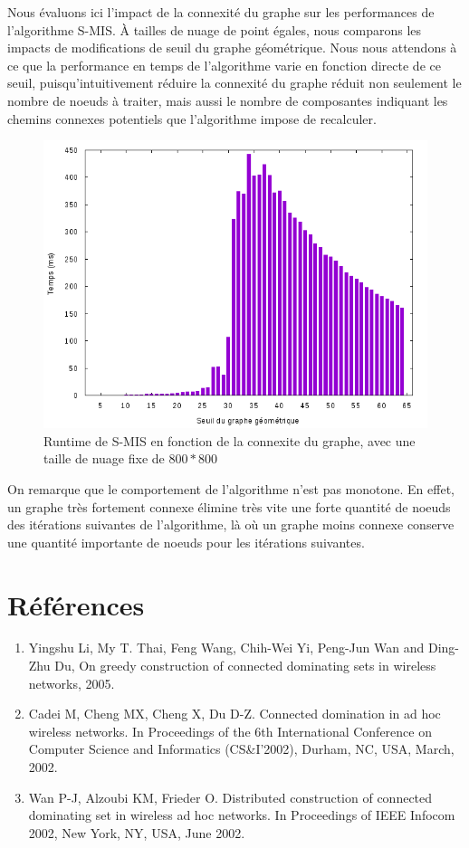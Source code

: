 \documentclass[]{report}
\providecommand{\tightlist}{%
  \setlength{\itemsep}{0pt}\setlength{\parskip}{0pt}}
\begin{document}
Nous évaluons ici l'impact de la connexité du graphe sur les
performances de l'algorithme S-MIS. À tailles de nuage de point égales,
nous comparons les impacts de modifications de seuil du graphe
géométrique. Nous nous attendons à ce que la performance en temps de
l'algorithme varie en fonction directe de ce seuil, puisqu'intuitivement
réduire la connexité du graphe réduit non seulement le nombre de noeuds
à traiter, mais aussi le nombre de composantes indiquant les chemins
connexes potentiels que l'algorithme impose de recalculer.

\begin{figure}
\centering
\includegraphics{img/connex.png}
\caption{Runtime de S-MIS en fonction de la connexite du graphe, avec
une taille de nuage fixe de \(800*800\)}
\end{figure}

On remarque que le comportement de l'algorithme n'est pas monotone. En
effet, un graphe très fortement connexe élimine très vite une forte
quantité de noeuds des itérations suivantes de l'algorithme, là où un
graphe moins connexe conserve une quantité importante de noeuds pour les
itérations suivantes.

\section{Références}\label{ruxe9fuxe9rences}

\begin{enumerate}
\def\labelenumi{\arabic{enumi}.}
\tightlist
\item
  Yingshu Li, My T. Thai, Feng Wang, Chih-Wei Yi, Peng-Jun Wan and
  Ding-Zhu Du, On greedy construction of connected dominating sets in
  wireless networks, 2005.
\item
  Cadei M, Cheng MX, Cheng X, Du D-Z. Connected domination in ad hoc
  wireless networks. In Proceedings of the 6th International Conference
  on Computer Science and Informatics (CS\&I'2002), Durham, NC, USA,
  March, 2002.
\item
  Wan P-J, Alzoubi KM, Frieder O. Distributed construction of connected
  dominating set in wireless ad hoc networks. In Proceedings of IEEE
  Infocom 2002, New York, NY, USA, June 2002.
\end{enumerate}
\end{document}
